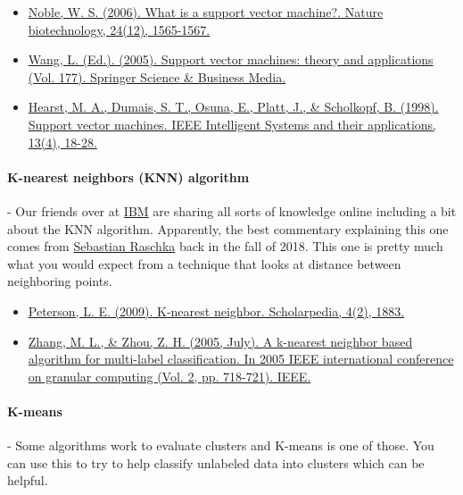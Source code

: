 \documentclass{article}
\begin{document}
\begin{itemize}
\item \href{https://www.ifi.uzh.ch/dam/jcr:00000000-7f84-9c3b-ffff-ffffc550ec57/what_is_a_support_vector_machine.pdf}{Noble, W. S. (2006). What is a support vector machine?. Nature biotechnology, 24(12), 1565-1567.} \cite{noble2006support}
\item \href{https://personal.ntu.edu.sg/elpwang/PDF_web/05_SVM_basic.pdf}{Wang, L. (Ed.). (2005). Support vector machines: theory and applications (Vol. 177). Springer Science \& Business Media.} \cite{wang2005support}
\item \href{https://www.ifi.uzh.ch/dam/jcr:00000000-7f84-9c3b-ffff-ffffbdb9a74e/SVM.pdf}{Hearst, M. A., Dumais, S. T., Osuna, E., Platt, J., \& Scholkopf, B. (1998). Support vector machines. IEEE Intelligent Systems and their applications, 13(4), 18-28.} \cite{hearst1998support}
\end{itemize}
\paragraph{K-nearest neighbors (KNN) algorithm} - Our friends over at \href{https://www.ibm.com/topics/knn }{IBM} are sharing all sorts of knowledge online including a bit about the KNN algorithm. Apparently, the best commentary explaining this one comes from \href{https://sebastianraschka.com/pdf/lecture-notes/stat479fs18/02_knn_notes.pdf}{Sebastian Raschka} back in the fall of 2018. This one is pretty much what you would expect from a technique that looks at distance between neighboring points. 

\begin{itemize}
\item \href{http://scholarpedia.org/article/K-nearest_neighbor}{Peterson, L. E. (2009). K-nearest neighbor. Scholarpedia, 4(2), 1883.} \cite{peterson2009k}
\item \href{https://www.researchgate.net/profile/Min-Ling-Zhang-2/publication/4196695_A_k-nearest_neighbor_based_algorithm_for_multi-label_classification/links/565d98f408ae1ef92982f866/A-k-nearest-neighbor-based-algorithm-for-multi-label-classification.pdf }{Zhang, M. L., \& Zhou, Z. H. (2005, July). A k-nearest neighbor based algorithm for multi-label classification. In 2005 IEEE international conference on granular computing (Vol. 2, pp. 718-721). IEEE.} \cite{zhang2005k}
\end{itemize}
\paragraph{K-means} - Some algorithms work to evaluate clusters and K-means is one of those. You can use this to try to help classify unlabeled data into clusters which can be helpful. 
\end{document}
